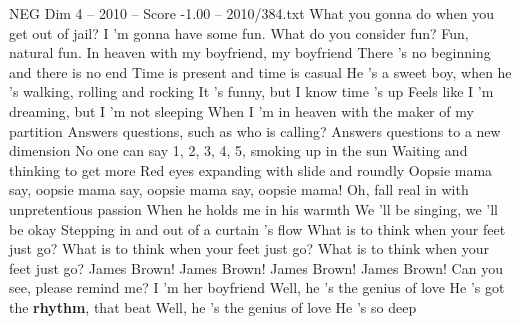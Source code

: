 \begin{textsample}{NEG Dim 4 – 2010 – Score -1.00 – 2010/384.txt}  \label{ex:f4_neg_019}
What you gonna do when you get out of jail?
I 'm gonna have some fun.
What do you consider fun?
Fun, natural fun.
In heaven with my boyfriend, my boyfriend There 's no beginning and there is no end Time is present and time is casual He 's a sweet boy, when he 's walking, rolling and rocking It 's funny, but I know time 's up Feels like I 'm dreaming, but I 'm not sleeping When I 'm in heaven with the maker of my partition Answers questions, such as who is calling?
Answers questions to a new dimension No one can say 1, 2, 3, 4, 5, smoking up in the sun Waiting and thinking to get more Red eyes expanding with slide and roundly Oopsie mama say, oopsie mama say, oopsie mama say, oopsie mama!
Oh, fall real in with unpretentious passion When he holds me in his warmth We 'll be singing, we 'll be okay Stepping in and out of a curtain 's flow What is to think when your feet just go?
What is to think when your feet just go?
What is to think when your feet just go?
James Brown!
James Brown!
James Brown!
James Brown!
Can you see, please remind me?
I 'm her boyfriend Well, he 's the genius of love He 's got the \textbf{rhythm}, that beat Well, he 's the genius of love He 's so deep

\end{textsample}
